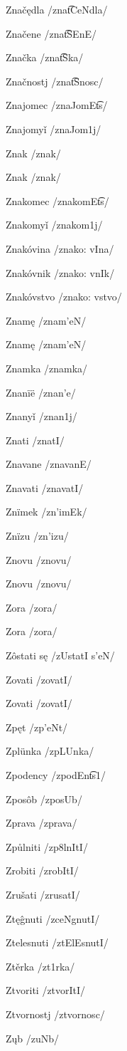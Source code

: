 Značędla /zna\t{tC}eNdla/

Značene /zna\t{tS}EnE/

Značka /zna\t{tS}ka/

Značnostj /zna\t{tS}nosc/

Znajomec /znaJomE\t{ts}/

Znajomyǐ /znaJom1j/

Znak /znak/

Znak /znak/

Znakomec /znakomE\t{ts}/

Znakomyǐ /znakom1j/

Znakóvina /znako: vIna/

Znakóvnik /znako: vnIk/

Znakóvstvo /znako: vstvo/

Znamę /znam’eN/

Znamę /znam’eN/

Znamka /znamka/

Znanïë /znan’e/

Znanyǐ /znan1j/

Znati /znatI/

Znavane /znavanE/

Znavati /znavatI/

Znïmek /zn’imEk/

Znïzu /zn’izu/

Znovu /znovu/

Znovu /znovu/

Zora /zora/

Zora /zora/

Zôstati sę /zUstatI s’eN/

Zovati /zovatI/

Zovati /zovatI/

Zpęt /zp’eNt/

Zplünka /zpL\:Unka/

Zpodency /zpodEn\t{ts}1/

Zposôb /zposUb/

Zprava /zprava/

Způlniti /zp8lnItI/

Zrobiti /zrobItI/

Zrušati /zru\:satI/

Ztęĝnuti /zceNgnutI/

Ztelesnuti /ztElEsnutI/

Ztěrka /zt1rka/

Ztvoriti /ztvorItI/

Ztvornostj /ztvornosc/

Zųb /zuNb/

